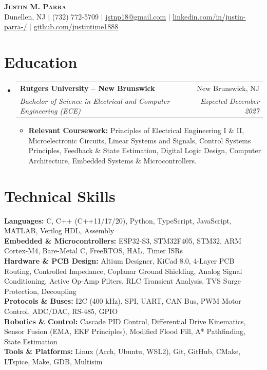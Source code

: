 \documentclass[letterpaper,10pt]{article}
\makeatletter
\newcommand{\resumeItem}[1]{
  \item\small{
    {#1 \vspace{-2pt}}
  }
}
\newcommand{\resumeSubheading}[4]{
  \vspace{-2pt}\item
    \begin{tabular*}{0.97\textwidth}[t]{l@{\extracolsep{\fill}}r}
      \textbf{#1} & #2 \\
      \textit{\small#3} & \textit{\small #4} \\
    \end{tabular*}\vspace{-7pt}
}
\newcommand{\resumeSubHeadingListStart}{\begin{itemize}[leftmargin=0.15in, label={}]}
\newcommand{\resumeSubHeadingListEnd}{\end{itemize}}
\newcommand{\resumeItemListStart}{\begin{itemize}[leftmargin=0.15in]}
\newcommand{\resumeItemListEnd}{\end{itemize}\vspace{-6pt}}
\makeatother
\begin{document}
\begin{center}
  \textbf{\Huge \scshape Justin M. Parra} \\ \vspace{2pt}
  \small Dunellen, NJ $|$ (732) 772-5709 $|$ \href{mailto:jstnp18@gmail.com}{\underline{jstnp18@gmail.com}} $|$ \href{https://linkedin.com/in/justin-parra-/}{\underline{linkedin.com/in/justin-parra-/}} $|$ \href{https://github.com/justintime1888}{\underline{github.com/justintime1888}}
\end{center}

\section{Education}
  \resumeSubHeadingListStart
    \resumeSubheading
      {Rutgers University -- New Brunswick}{New Brunswick, NJ}
      {Bachelor of Science in Electrical and Computer Engineering (ECE)}{Expected December 2027}
      \resumeItemListStart
        \resumeItem{\textbf{Relevant Coursework:} Principles of Electrical Engineering I \& II, Microelectronic Circuits, Linear Systems and Signals, Control Systems Principles, Feedback \& State Estimation, Digital Logic Design, Computer Architecture, Embedded Systems \& Microcontrollers.}
      \resumeItemListEnd
  \resumeSubHeadingListEnd\vspace{-12pt}

\section{Technical Skills}
 \begin{itemize}[leftmargin=0.15in, label={}]
    \small{\item{
     \textbf{Languages:} C, C++ (C++11/17/20), Python, TypeScript, JavaScript, MATLAB, Verilog HDL, Assembly \\
     \textbf{Embedded \& Microcontrollers:} ESP32-S3, STM32F405, STM32, ARM Cortex-M4, Bare-Metal C, FreeRTOS, HAL, Timer ISRs \\
     \textbf{Hardware \& PCB Design:} Altium Designer, KiCad 8.0, 4-Layer PCB Routing, Controlled Impedance, Coplanar Ground Shielding, Analog Signal Conditioning, Active Op-Amp Filters, RLC Transient Analysis, TVS Surge Protection, Decoupling \\
     \textbf{Protocols \& Buses:} I2C (400 kHz), SPI, UART, CAN Bus, PWM Motor Control, ADC/DAC, RS-485, GPIO \\
     \textbf{Robotics \& Control:} Cascade PID Control, Differential Drive Kinematics, Sensor Fusion (EMA, EKF Principles), Modified Flood Fill, A* Pathfinding, State Estimation \\
     \textbf{Tools \& Platforms:} Linux (Arch, Ubuntu, WSL2), Git, GitHub, CMake, LTspice, Make, GDB, Multisim \\
    }}
 \end{itemize}\vspace{-14pt}
\end{document}
